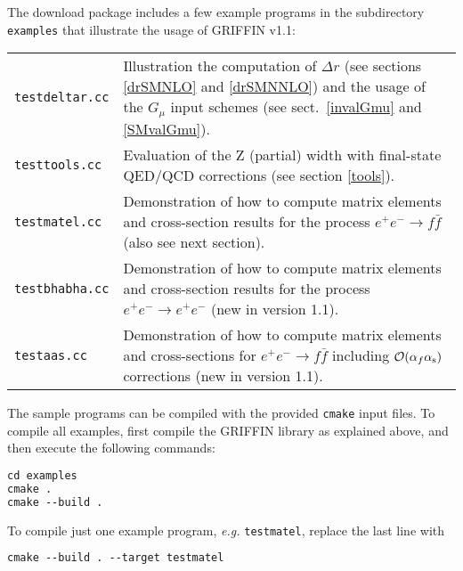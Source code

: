 \documentclass[12pt]{article}
\newcommand{\as}{\alpha_{\mathrm s}}
\begin{document}
The download package includes a few example programs in the subdirectory \texttt{examples} that illustrate the usage of GRIFFIN v1.1:

\bigskip\noindent
\begin{tabular}{@{}lp{}@{}}
\texttt{testdeltar.cc} & Illustration the computation of $\Delta r$ (see sections \ref{drSMNLO} and \ref{drSMNNLO}) and the usage of the $G_\mu$ input schemes (see sect.\ \ref{invalGmu} and \ref{SMvalGmu}). \\
\texttt{testtools.cc} & Evaluation of the Z (partial) width with final-state QED/QCD corrections (see section \ref{tools}). \\
\texttt{testmatel.cc} & Demonstration of how to compute matrix elements and cross-section results for the process $e^+e^- \to f\bar{f}$ (also see next section). \\
\texttt{testbhabha.cc} & Demonstration of how to compute matrix elements and cross-section results for the process $e^+e^- \to e^+e^-$ (new in version 1.1). \\
\texttt{testaas.cc} & Demonstration of how to compute matrix elements and cross-sections for  $e^+e^- \to f\bar{f}$ including ${\cal O}(\alpha_f\as)$ corrections (new in version 1.1).
\end{tabular}

\pagebreak[2]\bigskip\noindent
The sample programs can be compiled with the provided \texttt{cmake} input files. To compile all examples, first compile the GRIFFIN library as explained above, and then execute the following commands:
\begin{lstlisting}[language=make]
cd examples
cmake .
cmake --build .
\end{lstlisting}
\vspace{-2em}
To compile just one example program, \emph{e.g.} \texttt{testmatel}, replace the last line with
\begin{lstlisting}[language=make]
cmake --build . --target testmatel
\end{lstlisting}

\noindent
{}
\medskip
\end{document}
